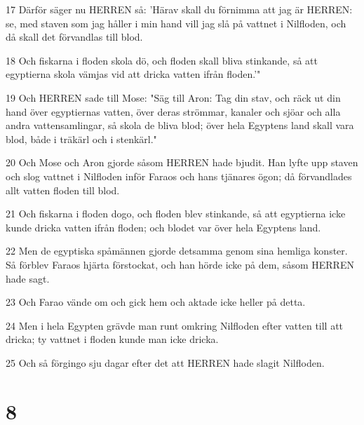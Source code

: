 \par 17 Därför säger nu HERREN så: 'Härav skall du förnimma att jag är HERREN: se, med staven som jag håller i min hand vill jag slå på vattnet i Nilfloden, och då skall det förvandlas till blod.
\par 18 Och fiskarna i floden skola dö, och floden skall bliva stinkande, så att egyptierna skola vämjas vid att dricka vatten ifrån floden.'"
\par 19 Och HERREN sade till Mose: "Säg till Aron: Tag din stav, och räck ut din hand över egyptiernas vatten, över deras strömmar, kanaler och sjöar och alla andra vattensamlingar, så skola de bliva blod; över hela Egyptens land skall vara blod, både i träkärl och i stenkärl."
\par 20 Och Mose och Aron gjorde såsom HERREN hade bjudit. Han lyfte upp staven och slog vattnet i Nilfloden inför Faraos och hans tjänares ögon; då förvandlades allt vatten floden till blod.
\par 21 Och fiskarna i floden dogo, och floden blev stinkande, så att egyptierna icke kunde dricka vatten ifrån floden; och blodet var över hela Egyptens land.
\par 22 Men de egyptiska spåmännen gjorde detsamma genom sina hemliga konster. Så förblev Faraos hjärta förstockat, och han hörde icke på dem, såsom HERREN hade sagt.
\par 23 Och Farao vände om och gick hem och aktade icke heller på detta.
\par 24 Men i hela Egypten grävde man runt omkring Nilfloden efter vatten till att dricka; ty vattnet i floden kunde man icke dricka.
\par 25 Och så förgingo sju dagar efter det att HERREN hade slagit Nilfloden.

\chapter{8}

